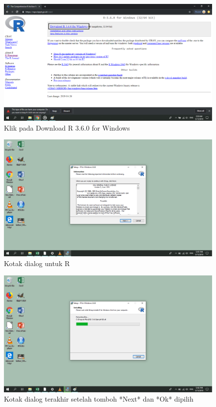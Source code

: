 \documentclass[]{book}
\begin{document}
\begin{figure}

{\centering \includegraphics[width=0.9\linewidth]{Gambar/r-download/09} 

}

\caption{Klik pada Download R 3.6.0 for Windows}\label{fig:install-r-3}
\end{figure}

\begin{figure}

{\centering \includegraphics[width=0.9\linewidth]{Gambar/r-download/10} 

}

\caption{Kotak dialog untuk R}\label{fig:install-r-4}
\end{figure}

\begin{figure}

{\centering \includegraphics[width=0.9\linewidth]{Gambar/r-download/11} 

}

\caption{Kotak dialog terakhir setelah tomboh *Next* dan *Ok* dipilih}\label{fig:install-r-5}
\end{figure}
\end{document}
